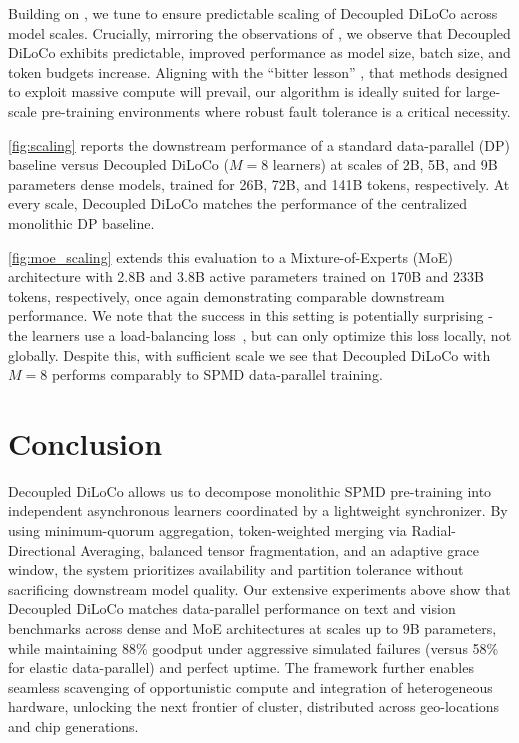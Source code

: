 \documentclass[11pt, a4paper, twocolumn, copyright, google]{google}
\begin{document}
Building on \citet{bergsma2025scalingcollapseefficientpredictable,qiu2025scalingcollapserevealsuniversal}, we tune to ensure predictable scaling of Decoupled DiLoCo across model scales.
Crucially, mirroring the observations of \citet{charles2025communication}, we observe that Decoupled DiLoCo exhibits predictable, improved performance as model size, batch size, and token budgets increase. Aligning with the ``bitter lesson'' \citep{sutton2019bitter}, that methods designed to exploit massive compute will prevail, our algorithm is ideally suited for large-scale pre-training environments where robust fault tolerance is a critical necessity.

\autoref{fig:scaling} reports the downstream performance of a standard data-parallel (DP) baseline versus Decoupled DiLoCo ($M=8$ learners) at scales of 2B, 5B, and 9B parameters dense models, trained for 26B, 72B, and 141B tokens, respectively. At every scale, Decoupled DiLoCo matches the performance of the centralized monolithic DP baseline. 

\autoref{fig:moe_scaling} extends this evaluation to a Mixture-of-Experts (MoE) architecture \citep{shazeer2017outrageously,fedus2022switch} with 2.8B and 3.8B active parameters trained on 170B and 233B tokens, respectively, once again demonstrating comparable downstream performance. We note that the success in this setting is potentially surprising - the learners use a load-balancing loss~\citep{shazeer2017outrageously}, but can only optimize this loss locally, not globally. Despite this, with sufficient scale we see that Decoupled DiLoCo with $M = 8$ performs comparably to SPMD data-parallel training.



\FloatBarrier %
\section{Conclusion}\label{sec:conclusions}

Decoupled DiLoCo allows us to decompose monolithic SPMD pre-training into independent asynchronous learners coordinated by a lightweight synchronizer.
By using minimum-quorum aggregation, token-weighted merging via Radial-Directional Averaging, balanced tensor fragmentation, and an adaptive grace window, the system prioritizes availability and partition tolerance without sacrificing downstream model quality. Our extensive experiments above show that Decoupled DiLoCo matches data-parallel performance on text and vision benchmarks across dense and MoE architectures at scales up to 9B parameters, while maintaining 88\% goodput under aggressive simulated failures (versus 58\% for elastic data-parallel) and perfect uptime. The framework further enables seamless scavenging of opportunistic compute and integration of heterogeneous hardware, unlocking the next frontier of cluster, distributed across geo-locations and chip generations.
\end{document}

